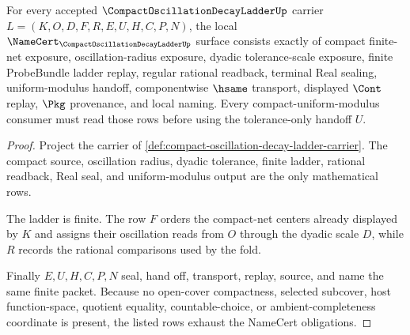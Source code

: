 \begin{theorem}
\label{thm:compact-oscillation-decay-ladder-namecert-obligations}
For every accepted $\CompactOscillationDecayLadderUp$ carrier $L=(K,O,D,F,R,E,U,H,C,P,N)$, the local $\NameCert_{\CompactOscillationDecayLadderUp}$ surface consists exactly of compact finite-net exposure, oscillation-radius exposure, dyadic tolerance-scale exposure, finite ProbeBundle ladder replay, regular rational readback, terminal Real sealing, uniform-modulus handoff, componentwise $\hsame$ transport, displayed $\Cont$ replay, $\Pkg$ provenance, and local naming. Every compact-uniform-modulus consumer must read those rows before using the tolerance-only handoff $U$.
\end{theorem}
\begin{proof}
Project the carrier of \autoref{def:compact-oscillation-decay-ladder-carrier}. The compact source, oscillation radius, dyadic tolerance, finite ladder, rational readback, Real seal, and uniform-modulus output are the only mathematical rows.

The ladder is finite. The row $F$ orders the compact-net centers already displayed by $K$ and assigns their oscillation reads from $O$ through the dyadic scale $D$, while $R$ records the rational comparisons used by the fold.

Finally $E,U,H,C,P,N$ seal, hand off, transport, replay, source, and name the same finite packet. Because no open-cover compactness, selected subcover, host function-space, quotient equality, countable-choice, or ambient-completeness coordinate is present, the listed rows exhaust the NameCert obligations.
\end{proof}

